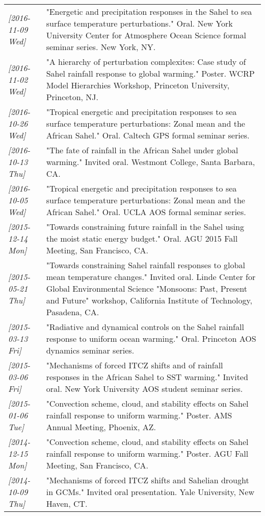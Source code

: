 \documentclass[12pt,letterpaper]{shillcv}
\begin{document}
\begin{center}
\begin{tabularx}{\textwidth}{lX}
\textit{[2016-11-09 Wed]} & "Energetic and precipitation responses in the Sahel to sea surface temperature perturbations."  Oral.  New York University Center for Atmosphere Ocean Science formal seminar series.  New York, NY.\\
\textit{[2016-11-02 Wed]} & "A hierarchy of perturbation complexites: Case study of Sahel rainfall response to global warming."  Poster.  WCRP Model Hierarchies Workshop, Princeton University, Princeton, NJ.\\
\textit{[2016-10-26 Wed]} & "Tropical energetic and precipitation responses to sea surface temperature perturbations: Zonal mean and the African Sahel."  Oral.  Caltech GPS formal seminar series.\\
\textit{[2016-10-13 Thu]} & "The fate of rainfall in the African Sahel under global warming."  Invited oral.  Westmont College, Santa Barbara, CA.\\
\textit{[2016-10-05 Wed]} & "Tropical energetic and precipitation responses to sea surface temperature perturbations: Zonal mean and the African Sahel."  Oral.  UCLA AOS formal seminar series.\\
\textit{[2015-12-14 Mon]} & "Towards constraining future rainfall in the Sahel using the moist static energy budget." Oral.  AGU 2015 Fall Meeting, San Francisco, CA.\\
\textit{[2015-05-21 Thu]} & "Towards constraining Sahel rainfall responses to global mean temperature changes."  Invited oral.  Linde Center for Global Environmental Science "Monsoons: Past, Present and Future" workshop, California Institute of Technology, Pasadena, CA.\\
\textit{[2015-03-13 Fri]} & "Radiative and dynamical controls on the Sahel rainfall response to uniform ocean warming."  Oral.  Princeton AOS dynamics seminar series.\\
\textit{[2015-03-06 Fri]} & "Mechanisms of forced ITCZ shifts and of rainfall responses in the African Sahel to SST warming."  Invited oral.  New York University AOS student seminar series.\\
\textit{[2015-01-06 Tue]} & "Convection scheme, cloud, and stability effects on Sahel rainfall response to uniform warming."  Poster.  AMS Annual Meeting, Phoenix, AZ.\\
\textit{[2014-12-15 Mon]} & "Convection scheme, cloud, and stability effects on Sahel rainfall response to uniform warming."  Poster.  AGU Fall Meeting, San Francisco, CA.\\
\textit{[2014-10-09 Thu]} & "Mechanisms of forced ITCZ shifts and Sahelian drought in GCMs."  Invited oral presentation.  Yale University, New Haven, CT.\\

\end{tabularx}
\end{center}
\end{document}
